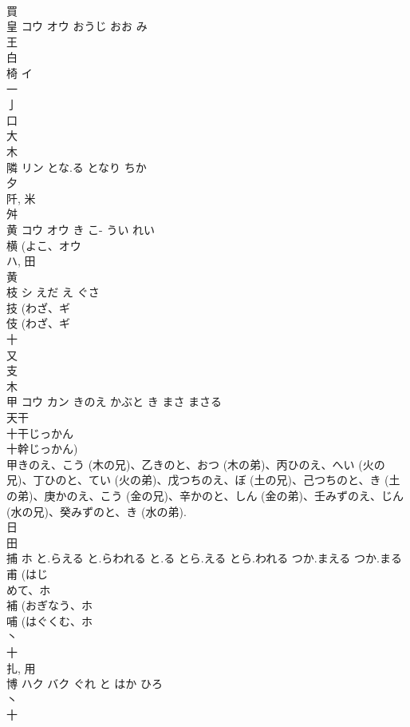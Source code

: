 \documentclass[8pt]{extreport}
\begin{document}
\begin{CJK}{UTF8}{min}
\\	買 
\\	皇	コウ オウ	おうじ おお み	
\\	王 
\\	白 
\\	椅	イ		
\\	一 
\\	亅 
\\	口 
\\	大 
\\	木 
\\	隣	リン	とな.る となり ちか	
\\	夕 
\\	阡, 米 
\\	舛 
\\	黄	コウ オウ	き こ- うい れい	
\\	横 (よこ、オウ 
\\	ハ, 田 
\\	黄 
\\	枝	シ	えだ え ぐさ	
\\	技 (わざ、ギ 
\\	伎 (わざ、ギ 
\\	十 
\\	又 
\\	支 
\\	木 
\\	甲	コウ カン	きのえ かぶと き まさ まさる	
\\	天干 
\\	十干じっかん 
\\	十幹じっかん) 
\\	甲きのえ、こう (木の兄)、乙きのと、おつ (木の弟)、丙ひのえ、へい (火の兄)、丁ひのと、てい (火の弟)、戊つちのえ、ぼ (土の兄)、己つちのと、き (土の弟)、庚かのえ、こう (金の兄)、辛かのと、しん (金の弟)、壬みずのえ、じん (水の兄)、癸みずのと、き (水の弟). 
\\	日 
\\	田 
\\	捕	ホ	と.らえる と.らわれる と.る とら.える とら.われる つか.まえる つか.まる	
\\	甫 (はじ
\\	めて、ホ 
\\	補 (おぎなう、ホ 
\\	哺 (はぐくむ、ホ 
\\	丶 
\\	十 
\\	扎, 用 
\\	博	ハク バク	ぐれ と はか ひろ	
\\	丶 
\\	十 

\end{CJK}
\end{document}

